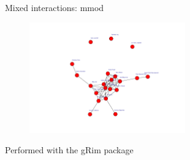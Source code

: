 \documentclass{beamer}
\begin{document}
\begin{frame}{Mixed interactions: mmod}
\begin{figure}[h]
\begin{center}
\includegraphics[width=0.6\textwidth]{Pic/mmod.pdf}
\label{mgm}
\end{center}
\end{figure}
\begin{center}
Performed with the gRim package \cite{grim}
\end{center}
\end{frame}
\end{document}
